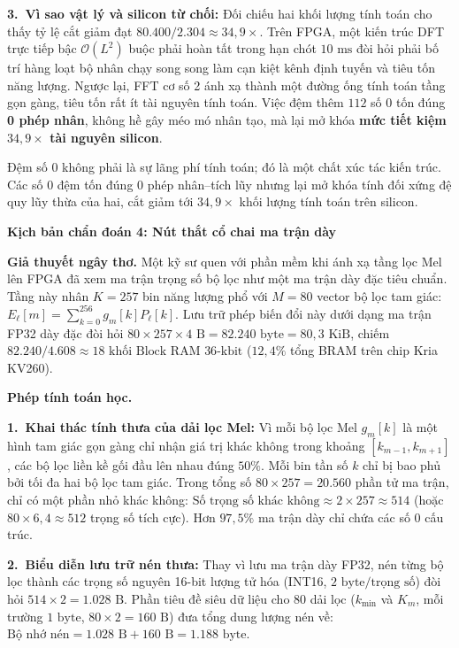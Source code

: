 \documentclass[11pt,a4paper]{article}
\newcommand{\diagsec}[1]{\vspace{1.6pt}\textbf{\large #1}\vspace{0.5pt}\par}
\begin{document}
\textbf{3.~Vì sao vật lý và silicon từ chối:} Đối chiếu hai khối lượng tính toán cho thấy tỷ lệ cắt giảm đạt $80{.}400 / 2{.}304 \approx 34{,}9\times$. Trên FPGA, một kiến trúc DFT trực tiếp bậc $\mathcal{O}(L^2)$ buộc phải hoàn tất trong hạn chót $10\text{ ms}$ đòi hỏi phải bố trí hàng loạt bộ nhân chạy song song làm cạn kiệt kênh định tuyến và tiêu tốn năng lượng. Ngược lại, FFT cơ số 2 ánh xạ thành một đường ống tính toán tầng gọn gàng, tiêu tốn rất ít tài nguyên tính toán. Việc đệm thêm $112$ số 0 tốn đúng \textbf{0 phép nhân}, không hề gây méo mó nhân tạo, mà lại mở khóa \textbf{mức tiết kiệm $34{,}9\times$ tài nguyên silicon}.

\begin{physicalinsight}
Đệm số 0 không phải là sự lãng phí tính toán; đó là một chất xúc tác kiến trúc. Các số 0 đệm tốn đúng 0 phép nhân--tích lũy nhưng lại mở khóa tính đối xứng đệ quy lũy thừa của hai, cắt giảm tới $34{,}9\times$ khối lượng tính toán trên silicon.
\end{physicalinsight}

\clearpage
\diagsec{Kịch bản chẩn đoán 4: Nút thắt cổ chai ma trận dày}

\textbf{Giả thuyết ngây thơ.} Một kỹ sư quen với phần mềm khi ánh xạ tầng lọc Mel lên FPGA đã xem ma trận trọng số bộ lọc như một ma trận dày đặc tiêu chuẩn. Tầng này nhân $K = 257$ bin năng lượng phổ với $M = 80$ vector bộ lọc tam giác: $E_\ell[m] = \sum_{k=0}^{256} g_m[k] P_\ell[k]$. Lưu trữ phép biến đổi này dưới dạng ma trận FP32 dày đặc đòi hỏi $80 \times 257 \times 4\text{ B} = 82{.}240\text{ byte} = 80{,}3\text{ KiB}$, chiếm $82{.}240 / 4{.}608 \approx 18\text{ khối Block RAM } 36\text{-kbit}$ ($12{,}4\%$ tổng BRAM trên chip Kria KV260).

\textbf{Phép tính toán học.}

\textbf{1.~Khai thác tính thưa của dải lọc Mel:} Vì mỗi bộ lọc Mel $g_m[k]$ là một hình tam giác gọn gàng chỉ nhận giá trị khác không trong khoảng $[k_{m-1}, k_{m+1}]$, các bộ lọc liền kề gối đầu lên nhau đúng $50\%$. Mỗi bin tần số $k$ chỉ bị bao phủ bởi tối đa hai bộ lọc tam giác. Trong tổng số $80 \times 257 = 20{.}560$ phần tử ma trận, chỉ có một phần nhỏ khác không:
$\text{Số trọng số khác không} \approx 2 \times 257 \approx 514$ (hoặc $80 \times 6{,}4 \approx 512$ trọng số tích cực). Hơn $97{,}5\%$ ma trận dày chỉ chứa các số 0 cấu trúc.

\textbf{2.~Biểu diễn lưu trữ nén thưa:} Thay vì lưu ma trận dày FP32, nén từng bộ lọc thành các trọng số nguyên 16-bit lượng tử hóa (INT16, $2\text{ byte/trọng số}$) đòi hỏi $514 \times 2 = 1{.}028\text{ B}$. Phần tiêu đề siêu dữ liệu cho 80 dải lọc ($k_{\text{min}}$ và $K_m$, mỗi trường $1\text{ byte}$, $80 \times 2 = 160\text{ B}$) đưa tổng dung lượng nén về:
$\text{Bộ nhớ nén} = 1{.}028\text{ B} + 160\text{ B} = 1{.}188\text{ byte}$.
\end{document}

